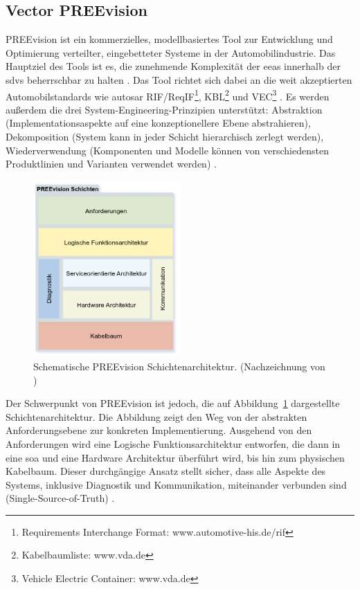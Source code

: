 \subsection{Vector PREEvision}
PREEvision ist ein kommerzielles, modellbasiertes Tool zur Entwicklung und Optimierung verteilter, eingebetteter Systeme in der Automobilindustrie. Das Hauptziel des Tools ist es, die zunehmende Komplexität der \glspl{eea} innerhalb der \glspl{sdv} beherrschbar zu halten \cite{askaripoor2022architecture}. Das  Tool richtet sich dabei an die weit akzeptierten Automobilstandards wie \gls{autosar} RIF/ReqIF\footnote{Requirements Interchange Format: www.automotive-his.de/rif}, KBL\footnote{Kabelbaumliste: www.vda.de
} und VEC\footnote{Vehicle Electric Container: www.vda.de} \cite{schauffele2016architectural}. Es werden außerdem die drei System-Engineering-Prinzipien unterstützt: Abstraktion (Implementationsaspekte auf eine konzeptionellere Ebene abstrahieren), Dekomposition (System kann in jeder Schicht hierarchisch zerlegt werden), Wiederverwendung (Komponenten und Modelle können von verschiedensten Produktlinien und Varianten verwendet werden) \cite{schauffele2016architectural}.

\begin{figure}[h!]
  \centering
  \includegraphics[width=0.5\textwidth]{figures/PREEVISION_LAYER.drawio.png}
  \caption{Schematische PREEvision Schichtenarchitektur. (Nachzeichnung von \cite{Vec23})}
  \label{fig:preevision_schicht}
\end{figure}

Der Schwerpunkt von PREEvision ist jedoch, die auf Abbildung~\ref{fig:preevision_schicht} dargestellte Schichtenarchitektur. Die Abbildung zeigt den Weg von der abstrakten Anforderungsebene zur konkreten Implementierung. Ausgehend von den Anforderungen wird eine Logische Funktionsarchitektur entworfen, die dann in eine \gls{soa} und eine Hardware Architektur überführt wird, bis hin zum physischen Kabelbaum. Dieser durchgängige Ansatz stellt sicher, dass alle Aspekte des Systems, inklusive Diagnostik und Kommunikation, miteinander verbunden sind (Single-Source-of-Truth) \cite{schauffele2016architectural}.


